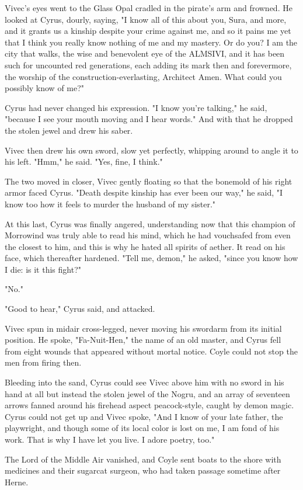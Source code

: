 Vivec’s eyes went to the Glass Opal cradled in the pirate’s arm and frowned. He looked at Cyrus, dourly, saying, "I know all of this about you, Sura, and more, and it grants us a kinship despite your crime against me, and so it pains me yet that I think you really know nothing of me and my mastery. Or do you? I am the city that walks, the wise and benevolent eye of the ALMSIVI, and it has been such for uncounted red generations, each adding its mark then and forevermore, the worship of the construction-everlasting, Architect Amen. What could you possibly know of me?"

Cyrus had never changed his expression. "I know you’re talking," he said, "because I see your mouth moving and I hear words." And with that he dropped the stolen jewel and drew his saber.

Vivec then drew his own sword, slow yet perfectly, whipping around to angle it to his left. "Hmm," he said. "Yes, fine, I think."

The two moved in closer, Vivec gently floating so that the bonemold of his right armor faced Cyrus. "Death despite kinship has ever been our way," he said, "I know too how it feels to murder the husband of my sister."

At this last, Cyrus was finally angered, understanding now that this champion of Morrowind was truly able to read his mind, which he had vouchsafed from even the closest to him, and this is why he hated all spirits of aether. It read on his face, which thereafter hardened. "Tell me, demon," he asked, "since you know how I die: is it this fight?"

"No."

"Good to hear," Cyrus said, and attacked.

Vivec spun in midair cross-legged, never moving his swordarm from its initial position. He spoke, "Fa-Nuit-Hen," the name of an old master, and Cyrus fell from eight wounds that appeared without mortal notice. Coyle could not stop the men from firing then.

Bleeding into the sand, Cyrus could see Vivec above him with no sword in his hand at all but instead the stolen jewel of the Nogru, and an array of seventeen arrows fanned around his firehead aspect peacock-style, caught by demon magic. Cyrus could not get up and Vivec spoke, "And I know of your late father, the playwright, and though some of its local color is lost on me, I am fond of his work. That is why I have let you live. I adore poetry, too."

The Lord of the Middle Air vanished, and Coyle sent boats to the shore with medicines and their sugarcat surgeon, who had taken passage sometime after Herne.

